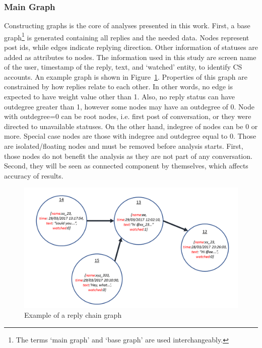 \documentclass[sigconf]{acmart}
\begin{document}
\subsubsection{Main Graph}

Constructing graphs is the core of analyses presented in this work. 
First, a base graph\footnote{The terms `main graph' and `base graph' are 
used interchangeably.} is generated containing all replies and the needed data. 
Nodes represent post ids, while edges indicate replying direction. Other 
information of statuses are added as attributes to nodes. The information used in
this study are screen name of the user, timestamp of the reply, text,
and `watched' entity, to identify CS accounts. An example graph is
shown in Figure~\ref{fig:replychaingraph}. Properties of this graph
are constrained by how replies relate to each other. In other words,
no edge is expected to have weight value other than 1. Also, no reply
status can have outdegree greater than 1, however some nodes may have
an outdegree of 0. Node with outdegree=0 can be root nodes, i.e. first
post of conversation, or they were directed to unavailable
statuses. On the other hand, indegree of nodes can be 0 or
more. Special case nodes are those with indegree and outdegree equal
to 0. Those are isolated/floating nodes and must be removed before
analysis starts. First, those nodes do not benefit the analysis as
they are not part of any conversation. Second, they will be seen as
connected component by themselves, which affects accuracy of results.

\begin{figure}[htb]
\centering
\includegraphics[width=\columnwidth]{images/replychaingraph.png}
\caption{Example of a reply chain graph}
\label{fig:replychaingraph}
\end{figure}
\end{document}
